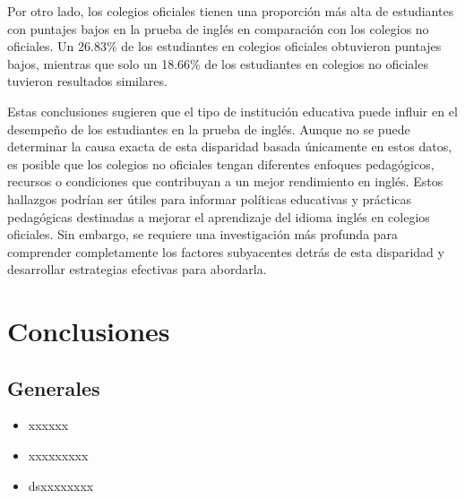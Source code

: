 \documentclass[12pt,a4paper,]{book}
\def\ifdoblecara{} %
\def\ifprincipal{} %
\numberwithin{dummy}{section}
\theoremstyle{ocrenumbox}
\theoremstyle{ocrenumbox}
\theoremstyle{ocrenumbox}
\theoremstyle{ocrenumbox}
\theoremstyle{ocrenum}
\begin{document}
Por otro lado, los colegios oficiales tienen una proporción más alta de
estudiantes con puntajes bajos en la prueba de inglés en comparación con
los colegios no oficiales. Un 26.83\% de los estudiantes en colegios
oficiales obtuvieron puntajes bajos, mientras que solo un 18.66\% de los
estudiantes en colegios no oficiales tuvieron resultados similares.

Estas conclusiones sugieren que el tipo de institución educativa puede
influir en el desempeño de los estudiantes en la prueba de inglés.
Aunque no se puede determinar la causa exacta de esta disparidad basada
únicamente en estos datos, es posible que los colegios no oficiales
tengan diferentes enfoques pedagógicos, recursos o condiciones que
contribuyan a un mejor rendimiento en inglés. Estos hallazgos podrían
ser útiles para informar políticas educativas y prácticas pedagógicas
destinadas a mejorar el aprendizaje del idioma inglés en colegios
oficiales. Sin embargo, se requiere una investigación más profunda para
comprender completamente los factores subyacentes detrás de esta
disparidad y desarrollar estrategias efectivas para abordarla.

\FloatBarrier

\ifdefined\ifprincipal
\else
\setlength{\parindent}{1em}
\pagestyle{fancy}
\setcounter{tocdepth}{4}
\tableofcontents

\fi

\ifdefined\ifdoblecara
\fancyhead{}{}
\fancyhead[LE,RO]{\scriptsize\rightmark}
\fancyfoot[LO,RE]{\scriptsize\slshape \leftmark}
\fancyfoot[C]{}
\fancyfoot[LE,RO]{\footnotesize\thepage}
\else
\fancyhead{}{}
\fancyhead[RO]{\scriptsize\rightmark}
\fancyfoot[LO]{\scriptsize\slshape \leftmark}
\fancyfoot[C]{}
\fancyfoot[RO]{\footnotesize\thepage}
\fi

\renewcommand{\headrulewidth}{0.4pt}
\renewcommand{\footrulewidth}{0.4pt}

\hypertarget{conclusiones-1}{%
\chapter{Conclusiones}\label{conclusiones-1}}

\hypertarget{generales}{%
\section{Generales}\label{generales}}

\begin{itemize}
\item
  xxxxxx
\item
  xxxxxxxxx
\item
  dsxxxxxxxx
\end{itemize}
\end{document}
